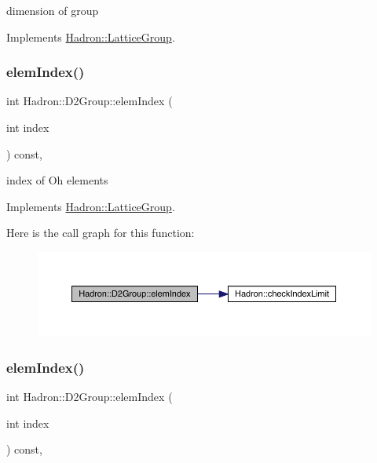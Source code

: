 dimension of group 

Implements \mbox{\hyperlink{structHadron_1_1LatticeGroup_abd8415698323796ef6a8605796ee3bea}{Hadron\+::\+Lattice\+Group}}.

\mbox{\label{structHadron_1_1D2Group_aa7676a51e002eb654648c4d84585d6da}} 
\subsubsection{\texorpdfstring{elemIndex()}{elemIndex()}\hspace{0.1cm}{\footnotesize\ttfamily [1/2]}}
{\footnotesize\ttfamily int Hadron\+::\+D2\+Group\+::elem\+Index (\begin{DoxyParamCaption}\item[{int}]{index }\end{DoxyParamCaption}) const\hspace{0.3cm}{\ttfamily [inline]}, {\ttfamily [virtual]}}

index of Oh elements 

Implements \mbox{\hyperlink{structHadron_1_1LatticeGroup_afb8e3ee60de059f75bce1044c694e1e8}{Hadron\+::\+Lattice\+Group}}.

Here is the call graph for this function\+:
\nopagebreak
\begin{figure}[H]
\begin{center}
\leavevmode
\includegraphics[width=350pt]{d8/de7/structHadron_1_1D2Group_aa7676a51e002eb654648c4d84585d6da_cgraph}
\end{center}
\end{figure}
\mbox{\label{structHadron_1_1D2Group_aa7676a51e002eb654648c4d84585d6da}} 
\subsubsection{\texorpdfstring{elemIndex()}{elemIndex()}\hspace{0.1cm}{\footnotesize\ttfamily [2/2]}}
{\footnotesize\ttfamily int Hadron\+::\+D2\+Group\+::elem\+Index (\begin{DoxyParamCaption}\item[{int}]{index }\end{DoxyParamCaption}) const\hspace{0.3cm}{\ttfamily [inline]}, {\ttfamily [virtual]}}

